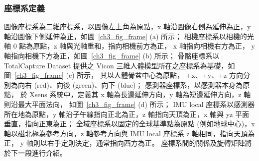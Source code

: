 \subsubsection{座標系定義}
圖像座標系為二維座標系，以圖像左上角為原點，x 軸沿圖像右側為延伸為正，y 軸沿圖像下側延伸為正，如圖~\ref{ch3_fig_frame} (a) 所示；
相機座標系以相機的光軸 0 點為原點，z 軸與光軸重和，指向相機前方為正， x 軸指向相機右方為正， y 軸指向相機下方為正，如圖~\ref{ch3_fig_frame} (b) 所示；
骨骼座標系以 TotalCapture Dataset 提供之 Vicon 三維人體模型所在之座標系為基礎，如圖~\ref{ch3_fig_frame} (c) 所示，
其以人體骨盆中心為原點， +x、+y、+z 方向分別為向右 (red)、向後 (green)、向下 (blue)；
感測器座標系，以感測器本身為原點，
於 Xsens 系統中，定義其 x 軸為長邊延伸方向，y 軸為短邊延伸方向，z 軸則沿最大平面法向，
如圖~\ref{ch3_fig_frame} (d) 所示；
IMU local 座標系以感測器所在地為原點，y 軸沿子午線指向正北為正，z 軸指向天頂為正，x 軸與 yz 平面垂直，指向正東為正；
全域座標系以固定的全球基準點為原點 (例如地球中心)，x 軸以磁北極為參考方向，z 軸參考方向與 IMU local 座標系 z 軸相同，指向天頂為正，
y 軸則以右手定則決定，通常指向西方為正。
座標系間的關係及旋轉矩陣將於下一段進行介紹。

